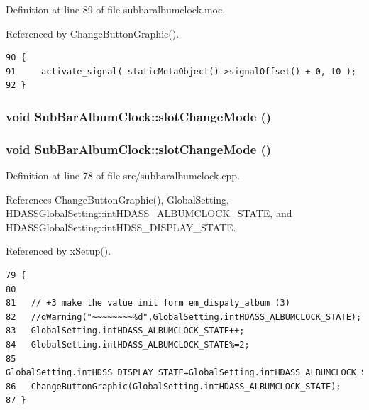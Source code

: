 Definition at line 89 of file subbaralbumclock.moc.

Referenced by Change\-Button\-Graphic().



\footnotesize\begin{verbatim}90 {
91     activate_signal( staticMetaObject()->signalOffset() + 0, t0 );
92 }
\end{verbatim}\normalsize 
{}
\subsubsection{\setlength{\rightskip}{0pt plus 5cm}void Sub\-Bar\-Album\-Clock::slot\-Change\-Mode ()\hspace{0.3cm}{\tt  [slot]}}\label{classSubBarAlbumClock_SubBarAlbumClocki2}


\subsubsection{\setlength{\rightskip}{0pt plus 5cm}void Sub\-Bar\-Album\-Clock::slot\-Change\-Mode ()\hspace{0.3cm}{\tt  [slot]}}\label{classSubBarAlbumClock_SubBarAlbumClocki0}




Definition at line 78 of file src/subbaralbumclock.cpp.

References Change\-Button\-Graphic(), Global\-Setting, HDASSGlobal\-Setting::int\-HDASS\_\-ALBUMCLOCK\_\-STATE, and HDASSGlobal\-Setting::int\-HDSS\_\-DISPLAY\_\-STATE.

Referenced by x\-Setup().



\footnotesize\begin{verbatim}79 {
80   
81   // +3 make the value init form em_dispaly_album (3)
82   //qWarning("~~~~~~~~%d",GlobalSetting.intHDASS_ALBUMCLOCK_STATE);
83   GlobalSetting.intHDASS_ALBUMCLOCK_STATE++;
84   GlobalSetting.intHDASS_ALBUMCLOCK_STATE%=2;
85   GlobalSetting.intHDSS_DISPLAY_STATE=GlobalSetting.intHDASS_ALBUMCLOCK_STATE+3;
86   ChangeButtonGraphic(GlobalSetting.intHDASS_ALBUMCLOCK_STATE);
87 }
\end{verbatim}\normalsize 
{}
